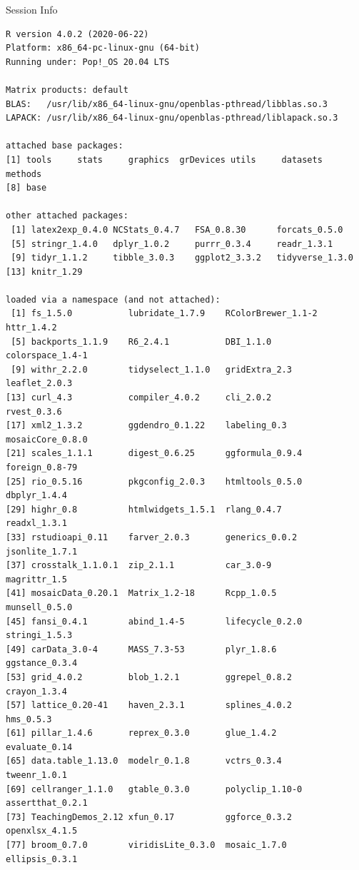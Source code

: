 \documentclass[10pt]{beamer}\usepackage[]{graphicx}\usepackage[]{color}
\makeatletter
\newenvironment{kframe}{%
 \def\at@end@of@kframe{}%
 \ifinner\ifhmode%
  \def\at@end@of@kframe{\end{minipage}}%
  \begin{minipage}{\columnwidth}%
 \fi\fi%
 \def\FrameCommand##1{\hskip\@totalleftmargin \hskip-\fboxsep
 \colorbox{shadecolor}{##1}\hskip-\fboxsep
     \hskip-\linewidth \hskip-\@totalleftmargin \hskip\columnwidth}%
 \MakeFramed {\advance\hsize-\width
   \@totalleftmargin\z@ \linewidth\hsize
   \@setminipage}}%
 {\par\unskip\endMakeFramed%
 \at@end@of@kframe}
\newenvironment{knitrout}{}{} %
\makeatother
\begin{document}
\begin{frame}[fragile]{Session Info}
	\tiny
	
\begin{knitrout}\tiny
{}\color{fgcolor}\begin{kframe}
\begin{verbatim}
R version 4.0.2 (2020-06-22)
Platform: x86_64-pc-linux-gnu (64-bit)
Running under: Pop!_OS 20.04 LTS

Matrix products: default
BLAS:   /usr/lib/x86_64-linux-gnu/openblas-pthread/libblas.so.3
LAPACK: /usr/lib/x86_64-linux-gnu/openblas-pthread/liblapack.so.3

attached base packages:
[1] tools     stats     graphics  grDevices utils     datasets  methods  
[8] base     

other attached packages:
 [1] latex2exp_0.4.0 NCStats_0.4.7   FSA_0.8.30      forcats_0.5.0  
 [5] stringr_1.4.0   dplyr_1.0.2     purrr_0.3.4     readr_1.3.1    
 [9] tidyr_1.1.2     tibble_3.0.3    ggplot2_3.3.2   tidyverse_1.3.0
[13] knitr_1.29     

loaded via a namespace (and not attached):
 [1] fs_1.5.0           lubridate_1.7.9    RColorBrewer_1.1-2 httr_1.4.2        
 [5] backports_1.1.9    R6_2.4.1           DBI_1.1.0          colorspace_1.4-1  
 [9] withr_2.2.0        tidyselect_1.1.0   gridExtra_2.3      leaflet_2.0.3     
[13] curl_4.3           compiler_4.0.2     cli_2.0.2          rvest_0.3.6       
[17] xml2_1.3.2         ggdendro_0.1.22    labeling_0.3       mosaicCore_0.8.0  
[21] scales_1.1.1       digest_0.6.25      ggformula_0.9.4    foreign_0.8-79    
[25] rio_0.5.16         pkgconfig_2.0.3    htmltools_0.5.0    dbplyr_1.4.4      
[29] highr_0.8          htmlwidgets_1.5.1  rlang_0.4.7        readxl_1.3.1      
[33] rstudioapi_0.11    farver_2.0.3       generics_0.0.2     jsonlite_1.7.1    
[37] crosstalk_1.1.0.1  zip_2.1.1          car_3.0-9          magrittr_1.5      
[41] mosaicData_0.20.1  Matrix_1.2-18      Rcpp_1.0.5         munsell_0.5.0     
[45] fansi_0.4.1        abind_1.4-5        lifecycle_0.2.0    stringi_1.5.3     
[49] carData_3.0-4      MASS_7.3-53        plyr_1.8.6         ggstance_0.3.4    
[53] grid_4.0.2         blob_1.2.1         ggrepel_0.8.2      crayon_1.3.4      
[57] lattice_0.20-41    haven_2.3.1        splines_4.0.2      hms_0.5.3         
[61] pillar_1.4.6       reprex_0.3.0       glue_1.4.2         evaluate_0.14     
[65] data.table_1.13.0  modelr_0.1.8       vctrs_0.3.4        tweenr_1.0.1      
[69] cellranger_1.1.0   gtable_0.3.0       polyclip_1.10-0    assertthat_0.2.1  
[73] TeachingDemos_2.12 xfun_0.17          ggforce_0.3.2      openxlsx_4.1.5    
[77] broom_0.7.0        viridisLite_0.3.0  mosaic_1.7.0       ellipsis_0.3.1    
\end{verbatim}
\end{kframe}
\end{knitrout}
	
\end{frame}
\end{document}
